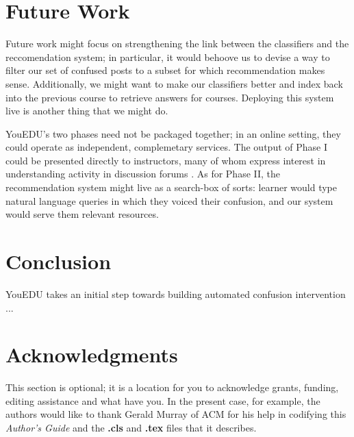 \documentclass{edm_template}
\begin{document}
\section{Future Work}
Future work might focus on strengthening the link between the classifiers and the reccomendation system; in particular, it would behoove us to devise a way to filter our set of confused posts to a subset for which recommendation makes sense. Additionally, we might want to make our classifiers better and index back into the previous course to retrieve answers for courses. Deploying this system live is another thing that we might do. 

YouEDU's two phases need not be packaged together; in an online setting, they could operate as independent, complemetary services. The output of Phase I could be presented directly to instructors, many of whom express interest in understanding activity in discussion forums \cite{Stephens-Martinez:2014:MMI:2556325.2566246}. As for Phase II, the recommendation system might live as a search-box of sorts: learner would type natural language queries in which they voiced their confusion, and our system would serve them relevant resources.

\section{Conclusion}
YouEDU takes an initial step towards building automated confusion intervention ... 


\section{Acknowledgments}
This section is optional\cite{wen2014sentiment}; it is a location for you
to acknowledge grants, funding, editing assistance and
what have you.  In the present case, for example, the
authors would like to thank Gerald Murray of ACM for
his help in codifying this \textit{Author's Guide}
and the \textbf{.cls} and \textbf{.tex} files that it describes.

%

%
%
\balancecolumns
\end{document}
